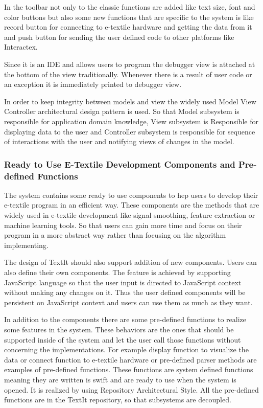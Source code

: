 	In the toolbar not only to the classic functions are added like text size, font and color buttons but also some new functions that are specific to the system is like record button for connecting to e-textile hardware and getting the data from it and push button for sending the user defined code to other platforms like Interactex.

	Since it is an IDE and allows users to program the debugger view is attached at the bottom of the view traditionally. Whenever there is a result of user code or an exception it is immediately printed to debugger view.	
	
	In order to keep integrity between models and view the widely used Model View Controller architectural design pattern is used. So that Model subsystem is responsible for application domain knowledge, View subsystem is Responsible for displaying data to the user and Controller subsystem is responsible for sequence of interactions with the user and notifying views of changes in the model.

	\subsubsection{Ready to Use E-Textile Development Components and Pre-defined Functions}
	The system contains some ready to use components to hep users to develop their e-textile program in an efficient way. These components are the methods that are widely used in e-textile development like signal smoothing, feature extraction or machine learning tools. So that users can gain more time and focus on their program in a more abstract way rather than focusing on the algorithm implementing.
	
	The design of TextIt should also support addition of new components. Users can also define their own components. The feature is achieved by supporting JavaScript language so that the user input is directed to JavaScript context without making any changes on it. Thus  the user defined components will be persistent on JavaScript context and users can use them as much as they want. 
	
	In addition to the components there are some pre-defined functions to realize some features in the system. These behaviors are the ones that should be supported inside of the system and let the user call those functions without concerning the implementations. For example display function to visualize the data or connect function to e-textile hardware or pre-defined parser methods are examples of pre-defined functions. These functions are system defined functions meaning they are written is swift and are ready to use when the system is opened. It is realized by using Repository Architectural Style. All the pre-defined functions are in the TextIt repository, so that subsystems are decoupled.
		
